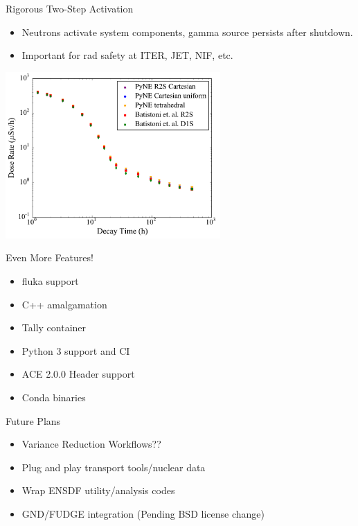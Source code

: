 \documentclass[xcolor=x11names,compress]{beamer}
\renewcommand{\(}{\begin{columns}}
\renewcommand{\)}{\end{columns}}
\newcommand{\<}[1]{\begin{column}{#1}}
\renewcommand{\>}{\end{column}}
\begin{document}
\begin{frame}{Rigorous Two-Step Activation}
    \begin{itemize}
        \item Neutrons activate system components, gamma source persists after shutdown.
        \item Important for rad safety at ITER, JET, NIF, etc.
    \end{itemize}  
    \begin{center}
        \includegraphics[height=2.5in,clip]{comp.pdf}  
    \end{center}
\end{frame}
\begin{frame}{Even More Features!}
    \begin{itemize}
        \item fluka support
        \item C++ amalgamation 
        \item Tally container
        \item Python 3 support and CI
        \item ACE 2.0.0 Header support
        \item Conda binaries
    \end{itemize}
\end{frame}


\begin{frame}{Future Plans}
    \begin{itemize}
    \item Variance Reduction Workflows??
    \item Plug and play transport tools/nuclear data
    \item Wrap ENSDF utility/analysis codes
    \item GND/FUDGE integration (Pending BSD license change) 
    \end{itemize}
\end{frame}
\end{document}
